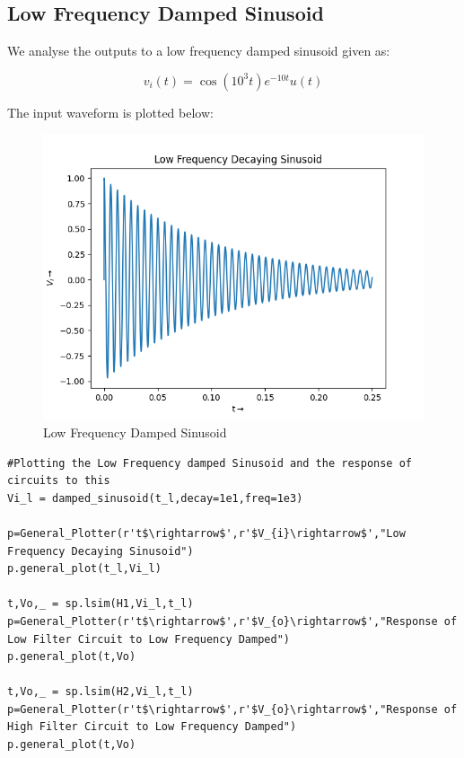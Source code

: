 \documentclass{article}
\begin{document}
\subsection*{Low Frequency Damped Sinusoid}
We analyse the outputs to a low frequency damped sinusoid given as:

\[v_i(t) = \cos(10^3 t) e^{-10t} u(t)\]

The input waveform is plotted below:

\begin{figure}[!tbh]
    \centering
    \includegraphics[scale=0.5]{plots/Low Frequency Decaying Sinusoid.png}   
    \caption{Low Frequency Damped Sinusoid}
\end{figure}


\begin{lstlisting}
#Plotting the Low Frequency damped Sinusoid and the response of circuits to this
Vi_l = damped_sinusoid(t_l,decay=1e1,freq=1e3)

p=General_Plotter(r't$\rightarrow$',r'$V_{i}\rightarrow$',"Low Frequency Decaying Sinusoid")
p.general_plot(t_l,Vi_l)

t,Vo,_ = sp.lsim(H1,Vi_l,t_l)
p=General_Plotter(r't$\rightarrow$',r'$V_{o}\rightarrow$',"Response of Low Filter Circuit to Low Frequency Damped")
p.general_plot(t,Vo)

t,Vo,_ = sp.lsim(H2,Vi_l,t_l)
p=General_Plotter(r't$\rightarrow$',r'$V_{o}\rightarrow$',"Response of High Filter Circuit to Low Frequency Damped")
p.general_plot(t,Vo)

\end{lstlisting}
\end{document}
